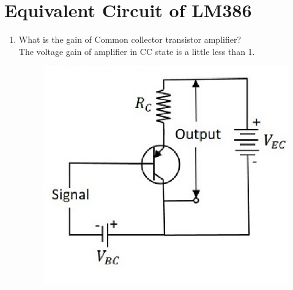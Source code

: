 \documentclass[journal,12pt,twocolumn]{IEEEtran}
\renewcommand\thesection{\arabic{section}}
\begin{document}
\section{Equivalent Circuit of LM386}
\begin{enumerate}[label=\thesection.\arabic*,ref=\thesection.\theenumi]
\section{ Common Collector(Emitter Follower) Buffer}


\item What is the gain of Common collector transistor amplifier?\\
\solution 
The voltage gain of amplifier in CC state is a little less than 1.
\begin{figure}[!ht]
\centering
\includegraphics[width=\columnwidth]{./figs/CC.eps}
\caption{}
\label{fig:1}
\end{figure}


\end{enumerate}
\end{document}
